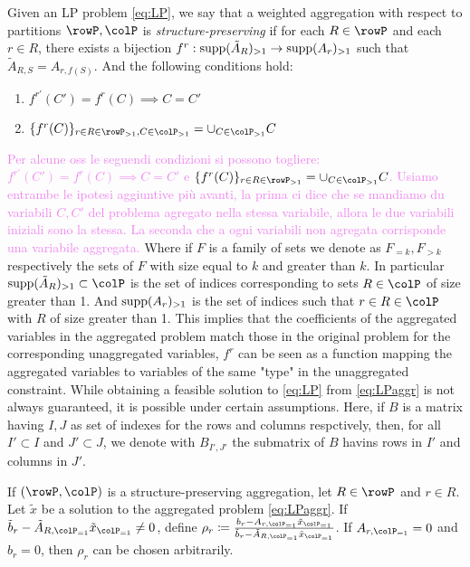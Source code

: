 { \begin{definition}
  Given an LP problem \eqref{eq:LP}, we say that a weighted aggregation with respect to partitions \(\rowP, \colP\) is \emph{structure-preserving} if for each \(R \in \rowP\) and each \(r \in R\), there exists a bijection \(f^r: \operatorname{supp}(\tilde{A}_R)_{>1} \to \operatorname{supp}(A_r)_{>1}\) such that \(\tilde{A}_{R,S} = A_{r,f(S)}\). And the following conditions hold:
  \begin{enumerate}
    \item \(f^{r'}(C') = f^r(C) \implies C=C'\)
    \item \(\{f^r(C)\}_{r\in R \in \rowP_{>1}, C \in \colP_{>1}} = \cup_{C \in \colP_{>1}}C\)
  \end{enumerate}
  \end{definition}

\textcolor{violet}{
Per alcune oss le seguendi condizioni si possono togliere: \(f^{r'}(C') = f^r(C) \implies C=C'\) e \(\{f^r(C)\}_{r\in R \in \rowP_{>1}} = \cup_{C \in \colP_{>1}}C\).
Usiamo entrambe le ipotesi aggiuntive più avanti, la prima ci dice che se mandiamo du variabili \(C,C'\) del problema agregato nella stessa variabile, allora le due variabili iniziali sono la stessa. La seconda che a ogni variabili non agregata corrisponde una variabile aggregata.
}
Where if \(F\) is a family of sets we denote as \(F_{=k}, F_{>k}\) respectively the sets of \(F\) with size equal to \(k\) and greater than \(k\).
In particular \(\supp(\tilde{A}_R)_{>1} \subset \colP\) is the set of indices corresponding to sets \(R \in \colP\) of size greater than 1. And \(\operatorname{supp}(A_r)_{>1}\) is the set of indices such that \(r \in R \in \colP\) with \(R\) of size greater than 1.
This implies that the coefficients of the aggregated variables in the aggregated problem match those in the original problem for the corresponding unaggregated variables, \(f^r\) can be seen as a function mapping the aggregated variables to variables of the same "type" in the unaggregated constraint.
 While obtaining a feasible solution to \eqref{eq:LP} from \eqref{eq:LPaggr} is not always guaranteed, it is possible under certain assumptions.
Here, if \(B\) is a matrix having \(I,J\) as set of indexes for the rows and columns respctively, then, for all \(I' \subset I\) and \(J' \subset J\), we denote with \(B_{I',J'}\) the submatrix of \(B\) havins rows in \(I'\) and columns in \(J'\).
\begin{observation}
\label{ob:aggrconstr}
If \((\rowP, \colP)\) is a structure-preserving aggregation, let \(R \in \rowP\) and \(r \in R\). Let \(\tilde{x}\) be a solution to the aggregated problem \eqref{eq:LPaggr}. If \(\tilde{b}_r - \tilde{A}_{R, \colP_{=1}} \tilde{x}_{\colP_{=1}} \neq 0\), define \(\rho_r \coloneqq \frac{b_r - A_{r, \colP_{=1}} \tilde{x}_{\colP_{=1}}}{\tilde{b}_r
 - \tilde{A}_{R, \colP_{=1}} \tilde{x}_{\colP_{=1}}}\). If \(A_{r, \colP_{=1}} = 0\) and \(b_r = 0\), then \(\rho_r\) can be chosen arbitrarily. 


\end{observation}}

